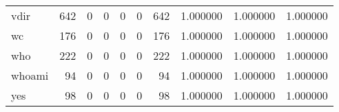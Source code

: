 \begin{tabular}{lrrrrrrrrr}
vdir      &                                                642 &                                                  0 &                                                  0 &                                                  0 &                                                  0 &                                                642 &                                           1.000000 &                               1.000000 &                             1.000000 \\
wc        &                                                176 &                                                  0 &                                                  0 &                                                  0 &                                                  0 &                                                176 &                                           1.000000 &                               1.000000 &                             1.000000 \\
who       &                                                222 &                                                  0 &                                                  0 &                                                  0 &                                                  0 &                                                222 &                                           1.000000 &                               1.000000 &                             1.000000 \\
whoami    &                                                 94 &                                                  0 &                                                  0 &                                                  0 &                                                  0 &                                                 94 &                                           1.000000 &                               1.000000 &                             1.000000 \\
yes       &                                                 98 &                                                  0 &                                                  0 &                                                  0 &                                                  0 &                                                 98 &                                           1.000000 &                               1.000000 &                             1.000000 \\
\bottomrule
\end{tabular}
